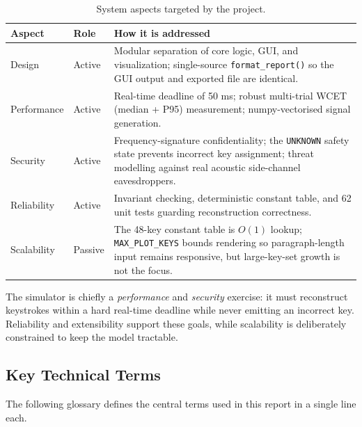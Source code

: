\documentclass[11pt,a4paper]{article}
\newcommand{\Key}[1]{\texttt{#1}}
\begin{document}
\begin{table}[H]
    \centering
    \begin{tabular}{@{}llp{9cm}@{}}
        \toprule
        \textbf{Aspect} & \textbf{Role} & \textbf{How it is addressed} \\
        \midrule
        Design & Active & Modular separation of core logic, GUI, and
            visualization; single-source \texttt{format\_report()} so the GUI
            output and exported file are identical. \\
        Performance & Active & Real-time deadline of 50 ms; robust multi-trial
            WCET (median + P95) measurement; numpy-vectorised signal
            generation. \\
        Security & Active & Frequency-signature confidentiality; the
            \Key{UNKNOWN} safety state prevents incorrect key assignment;
            threat modelling against real acoustic side-channel eavesdroppers.
            \\
        Reliability & Active & Invariant checking, deterministic constant
            table, and 62 unit tests guarding reconstruction correctness. \\
        Scalability & Passive & The 48-key constant table is $O(1)$ lookup;
            \texttt{MAX\_PLOT\_KEYS} bounds rendering so paragraph-length input
            remains responsive, but large-key-set growth is not the focus.
            \\
        \bottomrule
    \end{tabular}
    \caption{System aspects targeted by the project.}
    \label{tab:aspects}
\end{table}

\noindent
The simulator is chiefly a \emph{performance} and \emph{security} exercise: it
must reconstruct keystrokes within a hard real-time deadline while never
emitting an incorrect key. Reliability and extensibility support these goals,
while scalability is deliberately constrained to keep the model tractable.

\subsection{Key Technical Terms}

The following glossary defines the central terms used in this report in a
single line each.
\end{document}
